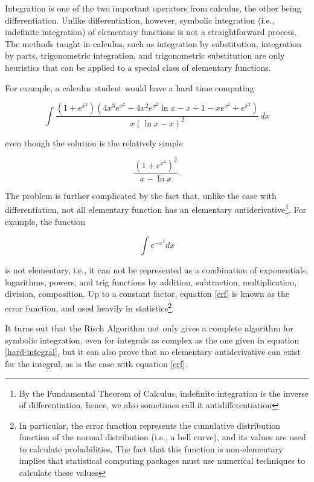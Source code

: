 \documentclass[12pt]{article}
\begin{document}
Integration is one of the two important operators from calculus, the
other being differentiation.  Unlike differentiation, however, symbolic
integration (i.e., indefinite integration) of elementary functions is
not a straightforward process. The methods taught in calculus, such as
integration by substitution, integration by parts, trigonometric
integration, and trigonometric substitution are only heuristics that can
be applied to a special class of elementary functions.  

For example, a calculus student would have a hard time computing

\begin{equation}
\label{hard-integral}
\int{
    \frac{\left( 1 + e^{x^2} \right)
        \left(4x^3e^{x^2} - 4x^2e^{x^2}\ln{x} - x + 1 - xe^{x^2} +
        e^{x^2}\right)}
    {x\left(\ln{x} - x\right)^2}\,dx}
\end{equation}

even though the solution is the relatively simple 

\begin{equation}
\label{hard-integral-sol}
\frac{\left(1 + e^{x^{2}}\right)^{2}}{x - \ln{x}}.
\end{equation}

The problem is further complicated by the fact that, unlike the case
with differentiation, not all elementary function has an elementary
antiderivative\footnote{By the Fundamental Theorem of Calculus,
indefinite integration is the inverse of differentiation, hence, we also
sometimes call it antidifferentiation}.  For example, the function

\begin{equation}
\label{erf}
\int{e^{-x^2}dx}
\end{equation}

is not elementary, i.e., it can not be represented as a combination of
exponentials, logarithms, powers, and trig functions by addition,
subtraction, multiplication, division, composition.  Up to a constant
factor, equation \ref{erf} is known as the error function, and used
heavily in statistics\footnote{In particular, the error function
represents the cumulative distribution function of the normal
distribution (i.e., a bell curve), and its values are used to calculate
probabilities.  The fact that this function is non-elementary implies
that statistical computing packages must use numerical techniques to
calculate these values}.

It turns out that the Risch Algorithm not only gives a complete
algorithm for symbolic integration, even for integrals as complex as the
one given in equation \ref{hard-integral}, but it can also prove that no
elementary antiderivative can exist for the integral, as is the case
with equation \ref{erf}.
\end{document}
